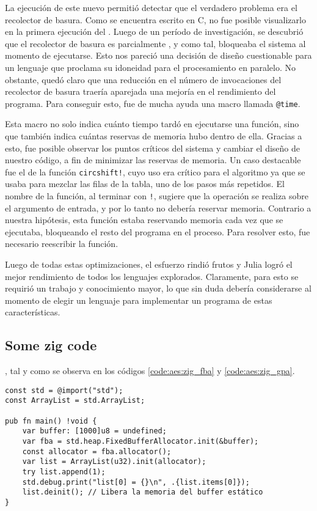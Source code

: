 La ejecución de este nuevo  permitió detectar que el verdadero problema era el recolector de basura. Como se encuentra escrito en C, no fue posible visualizarlo en la primera ejecución del . Luego de un período de investigación, se descubrió que el recolector de basura es parcialmente , y como tal, bloqueaba el sistema al momento de ejecutarse. Esto nos pareció una decisión de diseño cuestionable para un lenguaje que proclama su idoneidad para el procesamiento en paralelo. No obstante, quedó claro que una reducción en el número de invocaciones del recolector de basura traería aparejada una mejoría en el rendimiento del programa. Para conseguir esto, fue de mucha ayuda una macro llamada \lstinline{@time}.

Esta macro no solo indica cuánto tiempo tardó en ejecutarse una función, sino que también indica cuántas reservas de memoria hubo dentro de ella. Gracias a esto, fue posible observar los puntos críticos del sistema y cambiar el diseño de nuestro código, a fin de minimizar las reservas de memoria. Un caso destacable fue el de la función \lstinline{circshift!}, cuyo uso era crítico para el algoritmo ya que se usaba para mezclar las filas de la tabla, uno de los pasos más repetidos. El nombre de la función, al terminar con \lstinline{!}, sugiere que la operación se realiza sobre el argumento de entrada, y por lo tanto no debería reservar memoria. Contrario a nuestra hipótesis, esta función estaba reservando memoria cada vez que se ejecutaba, bloqueando el resto del programa en el proceso. Para resolver esto, fue necesario reescribir la función.

Luego de todas estas optimizaciones, el esfuerzo rindió frutos y Julia logró el mejor rendimiento de todos los lenguajes explorados. Claramente, para esto se requirió un trabajo y conocimiento mayor, lo que sin duda debería considerarse al momento de elegir un lenguaje para implementar un programa de estas características.

\subsection{Some zig code}

, tal y como se observa en los códigos \ref{code:aes:zig_fba} y \ref{code:aes:zig_gpa}.

\begin{listing}[h]
\begin{verbatim}
const std = @import("std");
const ArrayList = std.ArrayList;

pub fn main() !void {
    var buffer: [1000]u8 = undefined;
    var fba = std.heap.FixedBufferAllocator.init(&buffer);
    const allocator = fba.allocator();
    var list = ArrayList(u32).init(allocator);
    try list.append(1);
    std.debug.print("list[0] = {}\n", .{list.items[0]});
    list.deinit(); // Libera la memoria del buffer estático
}
\end{verbatim}
\caption{Inicialización de una lista en el  por medio de un \lstinline{FixedBufferAllocator}, en Zig}
\label{code:aes:zig_fba}
\end{listing}


